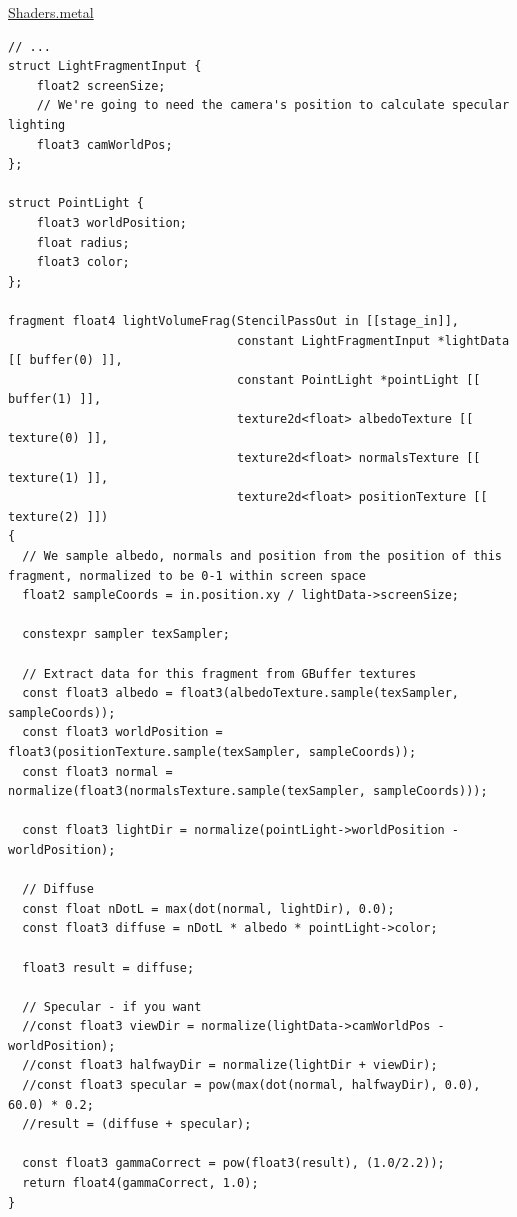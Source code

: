 \documentclass[11pt]{article}
\begin{document}
\uline{Shaders.metal}
\begin{verbatim}
// ...
struct LightFragmentInput {
    float2 screenSize;
    // We're going to need the camera's position to calculate specular lighting
    float3 camWorldPos;
};

struct PointLight {
    float3 worldPosition;
    float radius;
    float3 color;
};

fragment float4 lightVolumeFrag(StencilPassOut in [[stage_in]],
                                constant LightFragmentInput *lightData [[ buffer(0) ]],
                                constant PointLight *pointLight [[ buffer(1) ]],
                                texture2d<float> albedoTexture [[ texture(0) ]],
                                texture2d<float> normalsTexture [[ texture(1) ]],
                                texture2d<float> positionTexture [[ texture(2) ]])
{
  // We sample albedo, normals and position from the position of this fragment, normalized to be 0-1 within screen space
  float2 sampleCoords = in.position.xy / lightData->screenSize;

  constexpr sampler texSampler;

  // Extract data for this fragment from GBuffer textures
  const float3 albedo = float3(albedoTexture.sample(texSampler, sampleCoords));
  const float3 worldPosition = float3(positionTexture.sample(texSampler, sampleCoords));
  const float3 normal = normalize(float3(normalsTexture.sample(texSampler, sampleCoords)));

  const float3 lightDir = normalize(pointLight->worldPosition - worldPosition);

  // Diffuse
  const float nDotL = max(dot(normal, lightDir), 0.0);
  const float3 diffuse = nDotL * albedo * pointLight->color;

  float3 result = diffuse;

  // Specular - if you want
  //const float3 viewDir = normalize(lightData->camWorldPos - worldPosition);
  //const float3 halfwayDir = normalize(lightDir + viewDir);
  //const float3 specular = pow(max(dot(normal, halfwayDir), 0.0), 60.0) * 0.2;
  //result = (diffuse + specular);

  const float3 gammaCorrect = pow(float3(result), (1.0/2.2));
  return float4(gammaCorrect, 1.0);
}
\end{verbatim}
\end{document}
